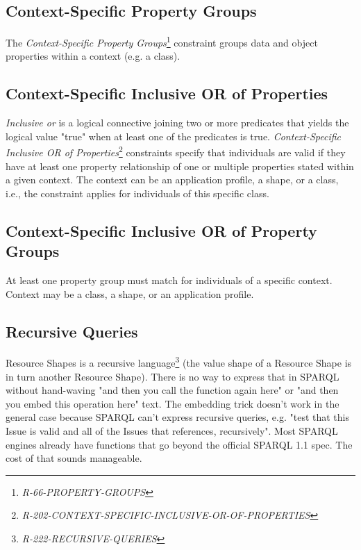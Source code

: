\documentclass{llncs}
\begin{document}
\subsection{Context-Specific Property Groups}

The \emph{Context-Specific Property Groups}\footnote{\emph{R-66-PROPERTY-GROUPS}} constraint groups data and object properties within a context (e.g. a class).

\subsection{Context-Specific Inclusive OR of Properties}

\emph{Inclusive or} is a logical connective joining two or more predicates that yields the logical value "true" when at least one of the predicates is true.
\emph{Context-Specific Inclusive OR of Properties}\footnote{\emph{R-202-CONTEXT-SPECIFIC-INCLUSIVE-OR-OF-PROPERTIES}} constraints specify that individuals are valid if they have at least one property relationship of one or multiple properties stated within a given context.
The context can be an application profile, a shape, or a class, i.e., the constraint applies for individuals of this specific class.

\subsection{Context-Specific Inclusive OR of Property Groups}

At least one property group must match for individuals of a specific context. 
Context may be a class, a shape, or an application profile.

\subsection{Recursive Queries}

Resource Shapes is a recursive language\footnote{\emph{R-222-RECURSIVE-QUERIES}} (the value shape of a Resource Shape is in turn another Resource Shape). 
There is no way to express that in SPARQL without hand-waving "and then you call the function again here" or "and then you embed this operation here" text.  
The embedding trick doesn't work
in the general case because SPARQL can't express recursive queries,
e.g. "test that this Issue is valid and all of the Issues that references, recursively".
Most SPARQL engines already have
functions that go beyond the official SPARQL 1.1 spec. 
The cost of that sounds manageable.
\end{document}

